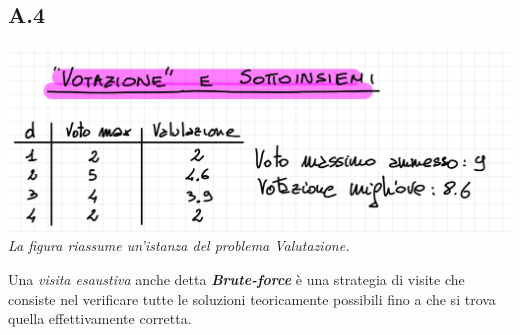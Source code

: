 \documentclass[a4paper]{article}
\newcommand{\imp}[1]{\textbf{\textit{#1}}}
\begin{document}
\subsection{A.4}
\includegraphics[width=\textwidth]{./img/A4}
\emph{La figura riassume un'istanza del problema Valutazione.}


Una \emph{visita esaustiva} anche detta \imp{Brute-force} è una strategia di visite che consiste nel verificare tutte le soluzioni teoricamente possibili fino a che si trova quella effettivamente corretta.
\end{document}

